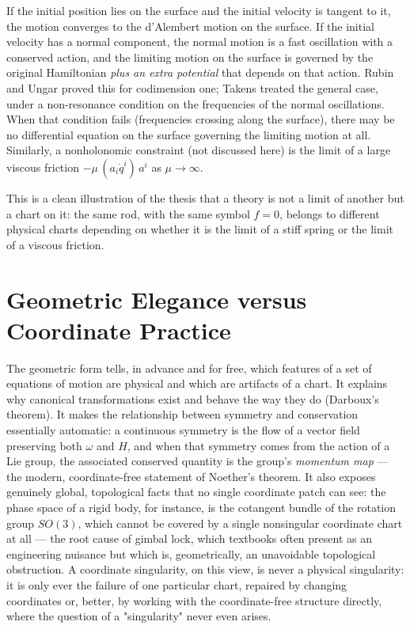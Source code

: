 If the initial position lies on the surface and the initial velocity is tangent
to it, the motion converges to the d'Alembert motion on the surface. If the
initial velocity has a normal component, the normal motion is a fast
oscillation with a conserved action, and the limiting motion on the surface is
governed by the original Hamiltonian \emph{plus an extra potential} that
depends on that action. Rubin and Ungar \cite{RubinUngar1957}proved this for
codimension one; Takens \cite{Takens1980} treated the general case, under a
non-resonance condition on the frequencies of the normal oscillations. When
that condition fails (frequencies crossing along the surface), there may be no
differential equation on the surface governing the limiting motion at all.
Similarly, a nonholonomic constraint (not discussed here)  is the limit of a
large viscous friction $-\mu\,(a_i\dot q^i)\,a^i$ as $\mu\to\infty$. 

This is a clean illustration of the thesis that a theory is not a limit of
another but a chart on it: the same rod, with the same symbol $f=0$, belongs
to different physical charts depending on whether it is the limit of a stiff
spring or the limit of a viscous friction.

\section[Geometry vs Coordinates]{Geometric Elegance versus Coordinate Practice }
\label{sec:cm-geom-vs-coord}
The geometric form tells, in advance and for
free, which features of a set of equations of motion are physical
and which are artifacts of a chart. It explains why canonical
transformations exist and behave the way they do (Darboux's
theorem). It makes the relationship between symmetry and conservation
essentially automatic: a continuous symmetry is the flow of a vector
field preserving both $\omega$ and $H$, and when that symmetry comes
from the action of a Lie group, the associated conserved quantity is
the group's \emph{momentum map} --- the modern, coordinate-free
statement of Noether's theorem.
It also exposes genuinely global, topological facts that no single
coordinate patch can see: the phase space of a rigid body, for
instance, is the cotangent bundle of the rotation group $SO(3)$,
which cannot be covered by a single nonsingular coordinate chart at
all --- the root cause of gimbal lock, which textbooks often present
as an engineering nuisance but which is, geometrically, an
unavoidable topological obstruction. A coordinate singularity, on
this view, is never a physical singularity: it is only ever the
failure of one particular chart, repaired by changing coordinates or,
better, by working with the coordinate-free structure directly, where
the question of a "singularity" never even arises.

